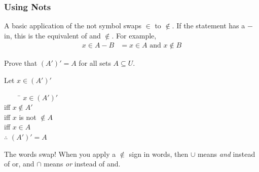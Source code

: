 \documentclass[\main/notes.tex]{subfiles}
\begin{document}
		\subsubsection{Using Nots}
			A basic application of the not symbol swaps $\in$ to $\notin$. If the statement has a $-$ in, this is the equivalent of and $\notin$. For example,
			\begin{align*}
				x \in A - B &= x \in A \text{ and } x \notin B 
			\end{align*}
			\begin{example}
				\begin{questions}[before=\raggedright]
					\item Prove that $(A')' = A$ for all sets $A \subseteq U$.
						\begin{answer}
							\begin{minipage}{0.6\textwidth}
								Let $x \in (A')'$
								\begin{tabbing}
									$\qquad$ \= $x \in (A')'$\\
									iff \> $x \notin A'$\\
									iff \> $x$ is not $\notin A$\\
									iff \> $x \in A$\\
									$\therefore$ \> $(A')' = A$
								\end{tabbing}
							\end{minipage}
							\begin{minipage}{0.33\textwidth}
								\begin{center}
									\begin{venntwo}[][]
										\fillA
									\end{venntwo}
								\end{center}
							\end{minipage}
						\end{answer}
				\end{questions}
			\end{example}
			\begin{sidenote}{The words swap!}
				When you apply a $\notin$ sign in words, then $\cup$ means \emph{and} instead of or, and $\cap$ means \emph{or} instead of and.
			\end{sidenote}
\end{document}
